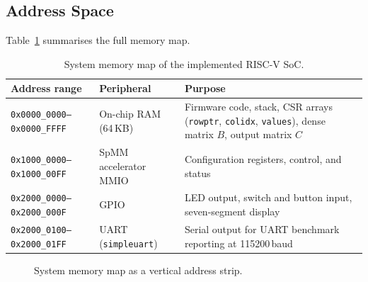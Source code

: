 \subsection{Address Space}

Table~\ref{tab:system-memory-map} summarises the full memory map.

\begin{table}[htbp]
  \centering
  \small
  \begin{tabular}{lp{3.0cm}p{5.5cm}}
  \toprule
  Address range & Peripheral & Purpose \\
  \midrule
  \texttt{0x0000\_0000--0x0000\_FFFF} & On-chip RAM (64\,KB) &
    Firmware code, stack, CSR arrays (\texttt{rowptr}, \texttt{colidx},
    \texttt{values}), dense matrix $B$, output matrix $C$ \\[4pt]
  \texttt{0x1000\_0000--0x1000\_00FF} & SpMM accelerator MMIO &
    Configuration registers, control, and status \\[4pt]
  \texttt{0x2000\_0000--0x2000\_000F} & GPIO &
    LED output, switch and button input, seven-segment display \\[4pt]
  \texttt{0x2000\_0100--0x2000\_01FF} & UART (\texttt{simpleuart}) &
    Serial output for UART benchmark reporting at 115200\,baud \\
  \bottomrule
  \end{tabular}
  \caption{System memory map of the implemented RISC-V SoC.}
  \label{tab:system-memory-map}
\end{table}

\begin{figure}[htbp]
  \centering
  \caption{System memory map as a vertical address strip.}
  \label{fig:memory-map}
\end{figure}

